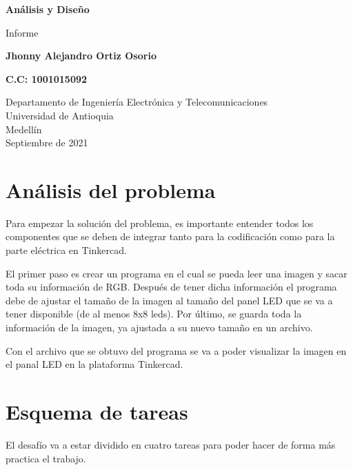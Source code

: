 \documentclass{article}
\begin{document}
\begin{titlepage}
    \begin{center}
        \vspace*{1cm} 
            
        \Huge
        \textbf{Análisis y Diseño}
            
        \vspace{0.5cm}
        \LARGE
        Informe 
            
        \vspace{1.5cm}
            
        \textbf{Jhonny Alejandro Ortiz Osorio}
        
        \textbf{C.C: 1001015092}
        
        \vfill
            
        \vspace{0.8cm}
            
        \Large
        Departamento de Ingeniería Electrónica y Telecomunicaciones\\
        Universidad de Antioquia\\
        Medellín\\
        Septiembre de 2021
            
    \end{center}
\end{titlepage}

\tableofcontents
\newpage
\section{Análisis del problema}\label{intro}
Para empezar la solución del problema, es importante entender todos los componentes que se deben de integrar tanto para la codificación como para la parte eléctrica en Tinkercad.

El primer paso es crear un programa en el cual se pueda leer una imagen y sacar toda su información de RGB. Después de tener dicha información el programa debe de ajustar el tamaño de la imagen al tamaño del panel LED que se va a tener disponible (de al menos 8x8 leds). Por último, se guarda toda la información de la imagen, ya ajustada a su nuevo tamaño en un archivo.

Con el archivo que se obtuvo del programa se va a poder visualizar la imagen en el panal LED en la plataforma Tinkercad.

\section{Esquema de tareas}\label{intro}
El desafío va a estar dividido en cuatro tareas para poder hacer de forma más practica el trabajo.
\end{document}
